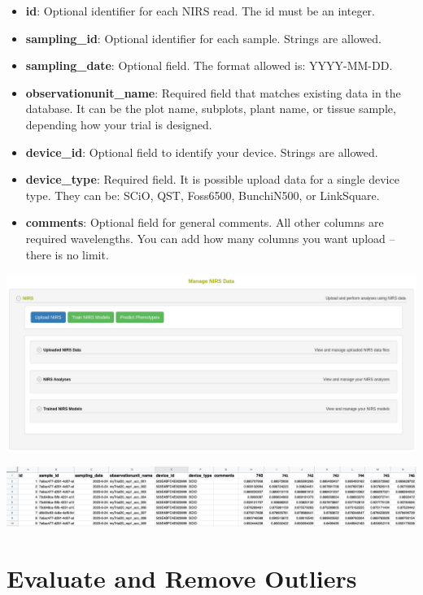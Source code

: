\documentclass[
  12pt,
]{book}
\providecommand{\tightlist}{%
  \setlength{\itemsep}{0pt}\setlength{\parskip}{0pt}}
\begin{document}
\begin{itemize}
\tightlist
\item
  \textbf{id}: Optional identifier for each NIRS read. The id must be an integer.
\item
  \textbf{sampling\_id}: Optional identifier for each sample. Strings are allowed.
\item
  \textbf{sampling\_date}: Optional field. The format allowed is: YYYY-MM-DD.
\item
  \textbf{observationunit\_name}: Required field that matches existing data in the database. It can be the plot name, subplots, plant name, or tissue sample, depending how your trial is designed.
\item
  \textbf{device\_id}: Optional field to identify your device. Strings are allowed.
\item
  \textbf{device\_type}: Required field. It is possible upload data for a single device type. They can be: SCiO, QST, Foss6500, BunchiN500, or LinkSquare.
\item
  \textbf{comments}: Optional field for general comments. All other columns are required wavelengths. You can add how many columns you want upload -- there is no limit.
\end{itemize}

\begin{center}\includegraphics[width=0.95\linewidth]{assets/images/manage_NIRS_main_display} \end{center}

\begin{center}\includegraphics[width=0.95\linewidth]{assets/images/upload_NIRS_example_format} \end{center}

\hypertarget{evaluate-and-remove-outliers}{%
\section{Evaluate and Remove Outliers}\label{evaluate-and-remove-outliers}}
\end{document}
